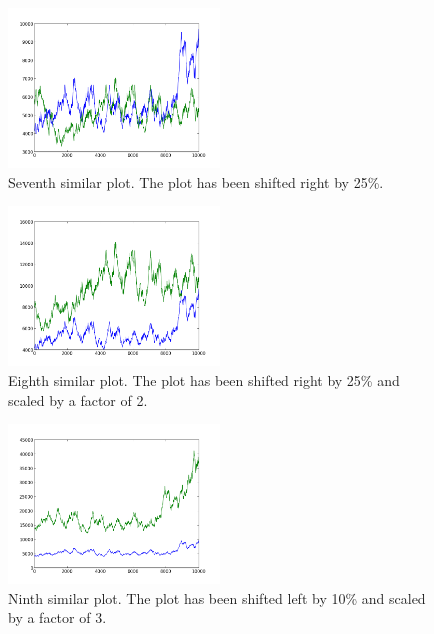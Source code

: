\begin{figure}[h!]
    \centering
    \includegraphics[width=0.5\textwidth]{images/mutant_7.png}
    \caption{Seventh similar plot.  The plot has been shifted right by 25\%.}
    \label{fig:mutant_7}
\end{figure}

\begin{figure}[h!]
    \centering
    \includegraphics[width=0.5\textwidth]{images/mutant_8.png}
    \caption{Eighth similar plot.  The plot has been shifted right by 25\% and scaled by a factor of 2.}
    \label{fig:mutant_8}
\end{figure}

\begin{figure}[h!]
    \centering
    \includegraphics[width=0.5\textwidth]{images/mutant_9.png}
    \caption{Ninth similar plot.  The plot has been shifted left by 10\% and scaled by a factor of 3.}
    \label{fig:mutant_9}
\end{figure}

